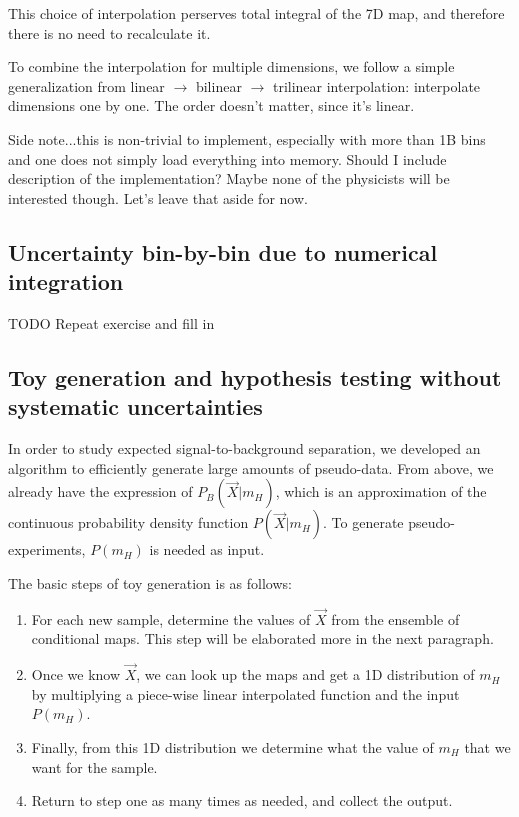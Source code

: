 \documentclass{cmspaper}
\begin{document}
This choice of interpolation perserves total integral of the 7D map, and therefore
there is no need to recalculate it.

To combine the interpolation for multiple dimensions, we follow a simple generalization
from linear $\rightarrow$ bilinear $\rightarrow$ trilinear interpolation:
interpolate dimensions one by one.  The order doesn't matter, since it's linear.

Side note...this is non-trivial to implement, especially with more than 1B bins
and one does not simply load everything into memory.
Should I include description of the implementation?
Maybe none of the physicists will be interested though.
Let's leave that aside for now.


\subsection{Uncertainty bin-by-bin due to numerical integration}

TODO Repeat exercise and fill in

\subsection{Toy generation and hypothesis testing without systematic uncertainties}

In order to study expected signal-to-background separation, we developed
an algorithm to efficiently generate large amounts of pseudo-data.
From above, we already have the expression of $P_B(\vec{X}|m_H)$,
which is an approximation of the continuous probability density function
$P(\vec{X}|m_H)$.  To generate pseudo-experiments, $P(m_H)$ is needed
as input.

The basic steps of toy generation is as follows:

\begin{enumerate}
\item For each new sample, determine the values of $\vec{X}$
from the ensemble of conditional maps.  This step will be
elaborated more in the next paragraph.
\item Once we know $\vec{X}$, we can look up the maps and get a
1D distribution of $m_H$ by multiplying a piece-wise linear
interpolated function and the input $P(m_H)$.
\item Finally, from this 1D distribution we determine what
the value of $m_H$ that we want for the sample.
\item Return to step one as many times as needed, and collect the output.
\end{enumerate}
\end{document}
